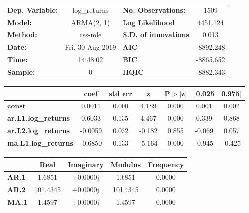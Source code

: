 \begin{center}
\begin{tabular}{lclc}
\toprule
\textbf{Dep. Variable:}     &        log\_returns       & \textbf{  No. Observations:  } &            1509            \\
\textbf{Model:}             &         ARMA(2, 1)        & \textbf{  Log Likelihood     } &          4451.124          \\
\textbf{Method:}            &          css-mle          & \textbf{  S.D. of innovations} &           0.013            \\
\textbf{Date:}              &      Fri, 30 Aug 2019     & \textbf{  AIC                } &         -8892.248          \\
\textbf{Time:}              &          14:48:02         & \textbf{  BIC                } &         -8865.652          \\
\textbf{Sample:}            &             0             & \textbf{  HQIC               } &         -8882.343          \\
\bottomrule
\end{tabular}
\begin{tabular}{lcccccc}
                            & \textbf{coef} & \textbf{std err} & \textbf{z} & \textbf{P$> |$z$|$} & \textbf{[0.025} & \textbf{0.975]}  \\
\midrule
\textbf{const}              &       0.0011  &        0.000     &     4.189  &         0.000        &        0.001    &        0.002     \\
\textbf{ar.L1.log\_returns} &       0.6033  &        0.135     &     4.467  &         0.000        &        0.339    &        0.868     \\
\textbf{ar.L2.log\_returns} &      -0.0059  &        0.032     &    -0.182  &         0.855        &       -0.069    &        0.057     \\
\textbf{ma.L1.log\_returns} &      -0.6850  &        0.133     &    -5.164  &         0.000        &       -0.945    &       -0.425     \\
\bottomrule
\end{tabular}
\begin{tabular}{lcccc}
              & \textbf{            Real} & \textbf{         Imaginary} & \textbf{         Modulus} & \textbf{        Frequency}  \\
\midrule
\textbf{AR.1} &                1.6851     &                +0.0000j     &                1.6851     &                0.0000       \\
\textbf{AR.2} &              101.4345     &                +0.0000j     &              101.4345     &                0.0000       \\
\textbf{MA.1} &                1.4597     &                +0.0000j     &                1.4597     &                0.0000       \\
\bottomrule
\end{tabular}
\end{center}
